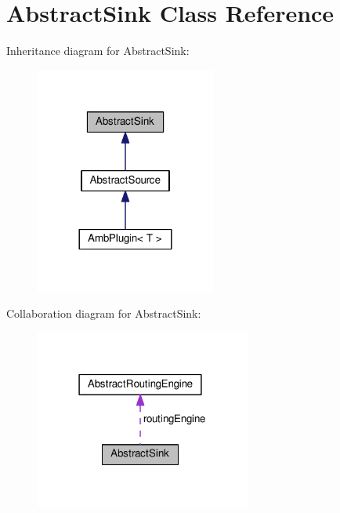 \hypertarget{classAbstractSink}{\section{Abstract\+Sink Class Reference}
\label{classAbstractSink}
}


Inheritance diagram for Abstract\+Sink\+:\nopagebreak
\begin{figure}[H]
\begin{center}
\leavevmode
\includegraphics[width=168pt]{classAbstractSink__inherit__graph}
\end{center}
\end{figure}


Collaboration diagram for Abstract\+Sink\+:\nopagebreak
\begin{figure}[H]
\begin{center}
\leavevmode
\includegraphics[width=202pt]{classAbstractSink__coll__graph}
\end{center}
\end{figure}

